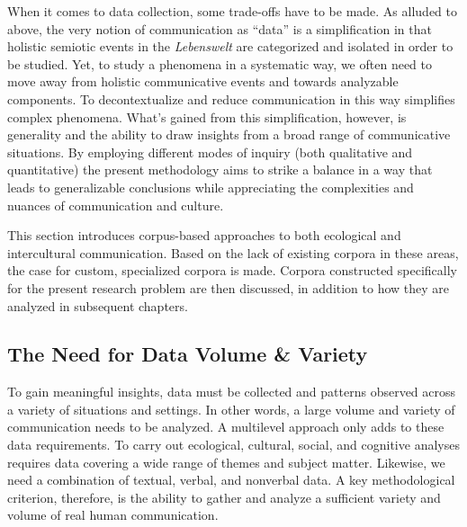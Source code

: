 When it comes to data collection, some trade-offs have to be made. As alluded to above, the very notion of communication as ``data'' is a simplification in that holistic semiotic events in the \textit{Lebenswelt} are categorized and isolated in order to be studied. Yet, to study a phenomena in a systematic way, we often need to move away from holistic communicative events and towards analyzable components. To decontextualize and reduce communication in this way simplifies complex phenomena. What's gained from this simplification, however, is generality and the ability to draw insights from a broad range of communicative situations. By employing different modes of inquiry (both qualitative and quantitative) the present methodology aims to strike a balance in a way that leads to generalizable conclusions while appreciating the complexities and nuances of communication and culture. 

This section introduces corpus-based approaches to both ecological and intercultural communication. Based on the lack of existing corpora in these areas, the case for custom, specialized corpora is made. Corpora constructed specifically for the present research problem are then discussed, in addition to how they are analyzed in subsequent chapters.

\subsection{The Need for Data Volume \& Variety}

To gain meaningful insights, data must be collected and patterns observed across a variety of situations and settings. In other words, a large volume and variety of communication needs to be analyzed. A multilevel approach only adds to these data requirements. To carry out ecological, cultural, social, and cognitive analyses requires data covering a wide range of themes and subject matter. Likewise, we need a combination of textual, verbal, and nonverbal data. A key methodological criterion, therefore, is the ability to gather and analyze a sufficient variety and volume of real human communication.

